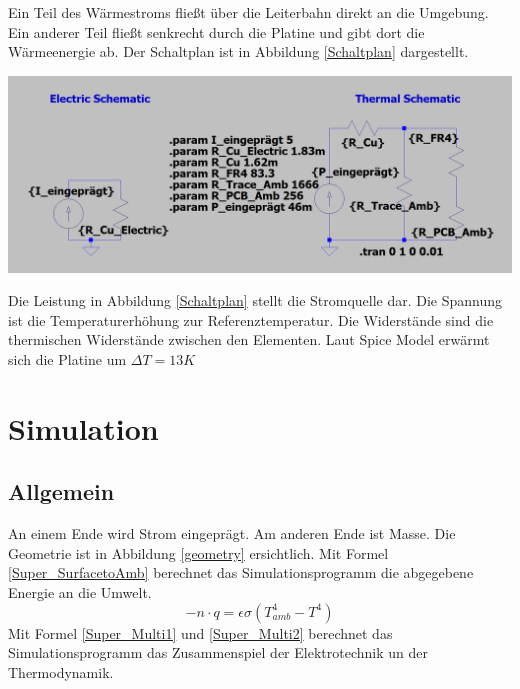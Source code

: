 \documentclass[10pt,a4paper,oneside,abstracton]{scrartcl}
\newenvironment{Figure}
  {\par\medskip\noindent\minipage{\linewidth}}
  {\endminipage\par\medskip}
\begin{document}
\begin{multicols}{2}
Ein Teil des Wärmestroms fließt über die Leiterbahn direkt an die Umgebung. 
\newline
Ein anderer Teil fließt senkrecht durch die Platine und gibt dort die Wärmeenergie ab. 
Der Schaltplan ist in Abbildung \ref*{Schaltplan} dargestellt. 
\begin{Figure}
	\includegraphics[width=\textwidth]{Bilder/Schaltplan.png}
	\label{Schaltplan}
\end{Figure}
\noindent
Die Leistung in Abbildung \ref{Schaltplan} stellt die Stromquelle dar. 
Die Spannung ist die Temperaturerhöhung zur Referenztemperatur. 
Die Widerstände sind die thermischen Widerstände zwischen den Elementen. 
\newline
Laut Spice Model erwärmt sich die Platine um $\Delta T = 13K$


\section{Simulation}
\subsection{Allgemein}
An einem Ende wird Strom eingeprägt. Am anderen Ende ist Masse.
Die Geometrie ist in Abbildung \ref*{geometry} ersichtlich.
\newline
Mit Formel \ref*{Super_SurfacetoAmb} berechnet das Simulationsprogramm die abgegebene Energie an die Umwelt.
\begin{equation}
	-n \cdot q = \epsilon \sigma (T^4_{amb} - T^4)
	\label{Super_SurfacetoAmb}
	\end{equation}
	\noindent
	Mit Formel \ref*{Super_Multi1} und \ref*{Super_Multi2} berechnet das Simulationsprogramm das Zusammenspiel der Elektrotechnik un der Thermodynamik.


\end{multicols}
\end{document}
